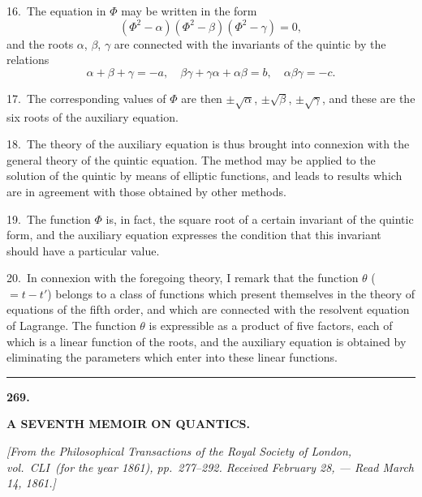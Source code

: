 \documentclass[11pt,a4paper]{book}
\begin{document}
\newpage
\setcounter{page}{328}

16.\ The equation in $\Phi$ may be written in the form
\[
(\Phi^2-\alpha)(\Phi^2-\beta)(\Phi^2-\gamma) = 0,
\]
and the roots $\alpha$, $\beta$, $\gamma$ are connected with the invariants of the quintic by the relations
\[
\alpha+\beta+\gamma = -a,\quad \beta\gamma+\gamma\alpha+\alpha\beta = b,\quad \alpha\beta\gamma = -c.
\]

17.\ The corresponding values of $\Phi$ are then $\pm\surd\alpha$, $\pm\surd\beta$, $\pm\surd\gamma$, and these are the six roots of the auxiliary equation.

\newpage
\setcounter{page}{329}

18.\ The theory of the auxiliary equation is thus brought into connexion with the general theory of the quintic equation. The method may be applied to the solution of the quintic by means of elliptic functions, and leads to results which are in agreement with those obtained by other methods.

19.\ The function $\Phi$ is, in fact, the square root of a certain invariant of the quintic form, and the auxiliary equation expresses the condition that this invariant should have a particular value.

20.\ In connexion with the foregoing theory, I remark that the function $\theta$ ($=t-t'$) belongs to a class of functions which present themselves in the theory of equations of the fifth order, and which are connected with the resolvent equation of Lagrange. The function $\theta$ is expressible as a product of five factors, each of which is a linear function of the roots, and the auxiliary equation is obtained by eliminating the parameters which enter into these linear functions.

\bigskip
\begin{center}
\rule{0.5\textwidth}{0.4pt}
\end{center}


\newpage
\setcounter{page}{330}
\begin{center}
\textbf{269.}\par
\smallskip
\textbf{A SEVENTH MEMOIR ON QUANTICS.}\par
\smallskip
\textit{[From the \textit{Philosophical Transactions} of the Royal Society of London, vol.~CLI\ (for the year 1861), pp.~277--292. Received February 28, --- Read March 14, 1861.]}
\end{center}
\end{document}
